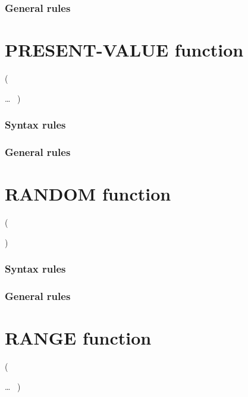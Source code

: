 \subsubsection{General rules}

\section{PRESENT-VALUE function}

\begin{syntax}
    (
  \argument \argument
  \begin{0-1}
    \argument
  \end{0-1} \ldots
  \ {})
\end{syntax}

\subsubsection{Syntax rules}

\subsubsection{General rules}

\section{RANDOM function}

\begin{syntax}
    (
  \begin{0-1}
    \argument
  \end{0-1}
  )
\end{syntax}

\subsubsection{Syntax rules}

\subsubsection{General rules}

\section{RANGE function}

\begin{syntax}
    (
  \begin{1=}
    \argument
  \end{1=}\ldots
  \ {})
\end{syntax}

